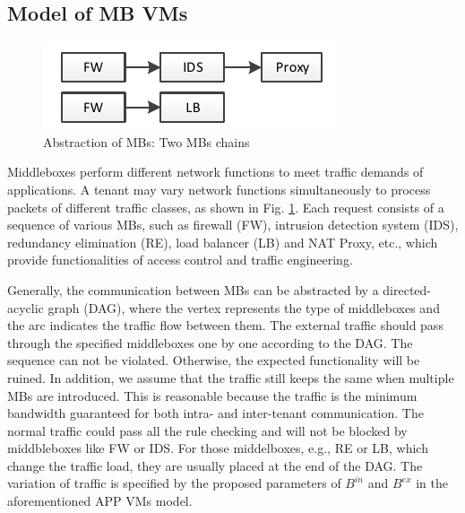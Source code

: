 \documentclass[review]{elsarticle}
\begin{document}



\subsection{Model of MB VMs}\label{sec:modelformb}

\begin{figure}
	\centering
	\includegraphics[width=3.5 in]{fig/chain.pdf}
	\caption{Abstraction of MBs: Two MBs chains}
	\label{fig:chain}
\end{figure}

Middleboxes perform different network functions to meet traffic demands of applications. A tenant may vary network functions simultaneously to process packets of different traffic classes, as shown in Fig. \ref{fig:chain}. Each request consists of a sequence of various MBs, such as firewall (FW), intrusion detection system (IDS), redundancy elimination (RE), load balancer (LB) and NAT Proxy, etc., which provide functionalities of access control and traffic engineering. 


Generally, the communication between MBs can be abstracted by a directed-acyclic graph (DAG), where the vertex represents the type of middleboxes and the arc indicates the traffic flow between them. The external traffic should pass through the specified middleboxes one by one according to the DAG. The sequence can not be violated. Otherwise, the expected functionality will be ruined. In addition, we assume that the traffic still keeps the same when multiple MBs are introduced. This is reasonable because the traffic is the minimum bandwidth guaranteed for both intra- and inter-tenant communication. The normal traffic could pass all the rule checking and will not be blocked by middbleboxes like FW or IDS. For those middelboxes, e.g., RE or LB, which change the traffic load, they are usually placed at the end of the DAG. The variation of traffic is specified by the proposed parameters of $B^{in}$ and $B^{ex}$ in the aforementioned APP VMs model.
\end{document}
